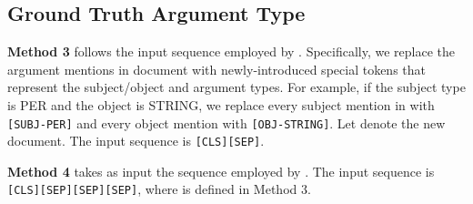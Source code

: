 \documentclass[11pt,a4paper]{article}
\begin{document}
\subsection{Ground Truth Argument Type}
\label{sec:gtargtype}

\noindent \textbf{Method 3} follows the input sequence employed by \citet{joshi2019spanbert}. Specifically, we replace the argument mentions in document  with newly-introduced special tokens that represent the subject/object and argument types. For example, if the subject type is PER and the object is STRING, we replace every subject mention in  with \texttt{[SUBJ-PER]} and every object mention with \texttt{[OBJ-STRING]}. Let  denote the new document. The input sequence is \texttt{[CLS]}\texttt{[SEP]}.
    
\noindent \textbf{Method 4} takes as input the sequence employed by \citet{shi2019simple}. The input sequence is \texttt{[CLS]}\texttt{[SEP]}\texttt{[SEP]}\texttt{[SEP]}, where  is defined in Method 3. 
\end{document}
